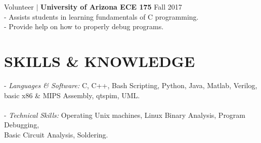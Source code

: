 \documentclass[line, 12pt]{res}
\newcommand\tab[1][0.5cm]{\hspace*{#1}}
\begin{document}
\begin{resume}
	Volunteer $\mid$ \textbf{University of Arizona ECE 175} \hfill Fall 2017 \\
		\tab - Assists students in learning fundamentals of C programming. \\
		\tab - Provide help on how to properly debug programs.

\section{SKILLS \& KNOWLEDGE} 
	- {\sl Languages \& Software:} C, C++, Bash Scripting, Python, Java, Matlab, Verilog, \\ \tab[4.48cm] basic x86 \& MIPS Assembly, qtspim, UML. \\ \\
	- {\sl Technical Skills:} Operating Unix machines, Linux Binary Analysis, Program Debugging, \\ \tab[3.25cm] Basic Circuit Analysis, Soldering.
 

\end{resume}
\end{document}
